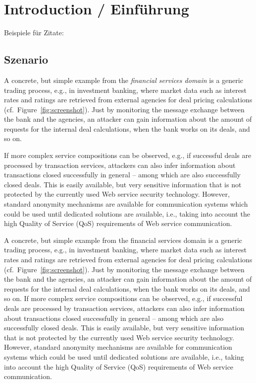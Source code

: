 \section{Introduction / Einführung}
Beispiele f\"ur Zitate: 	\cite{Schneier2004,Anderson2008,Eckert2007,Howard1998,Jaquith2007,Schneier2003}

\subsection{Szenario}
A concrete, but simple example from the \emph{financial services domain} is a generic trading process, e.g., in investment banking, where market data such as interest rates and ratings are retrieved from external agencies for deal pricing calculations (cf.~Figure~\ref{fig:screenshot}). Just by monitoring the message exchange between the bank and the agencies, an attacker can gain information about the amount of requests for the internal deal calculations, when the bank works on its deals, and so on. 

If more complex service compositions can be observed, e.g., if successful deals are processed by transaction services, attackers can also infer information about transactions closed successfully in general -- among which are also successfully closed deals. This is easily available, but very sensitive information that is not protected by the currently used Web service security technology. However, standard anonymity mechanisms are available for communication systems which could be used until dedicated solutions are available, i.e., taking into account the high Quality of Service (QoS) requirements of Web service communication. 

A concrete, but simple example from the financial services domain is a generic trading process, e.g., in investment banking, where market data such as interest rates and ratings are retrieved from external agencies for deal pricing calculations (cf.~Figure~\ref{fig:screenshot}). Just by monitoring the message exchange between the bank and the agencies, an attacker can gain information about the amount of requests for the internal deal calculations, when the bank works on its deals, and so on. If more complex service compositions can be observed, e.g., if successful deals are processed by transaction services, attackers can also infer information about transactions closed successfully in general -- among which are also successfully closed deals. This is easily available, but very sensitive information that is not protected by the currently used Web service security technology. However, standard anonymity mechanisms are available for communication systems which could be used until dedicated solutions are available, i.e., taking into account the high Quality of Service (QoS) requirements of Web service communication. 

